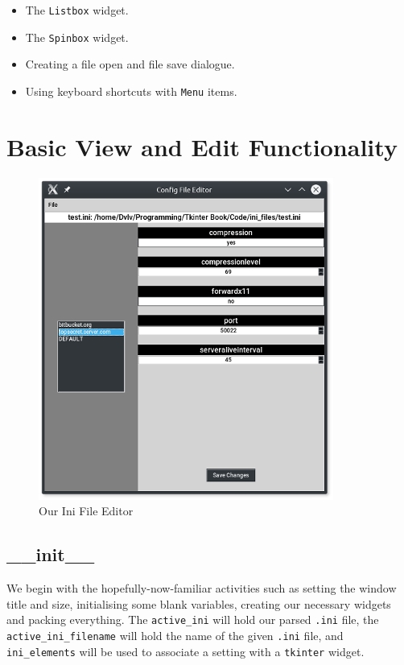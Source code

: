 \documentclass[a4paper,11pt,openany]{book}
\begin{document}
\begin{itemize}
  \item The \lstinline[columns=fixed]{Listbox} widget.
  \item The \lstinline[columns=fixed]{Spinbox} widget.
  \item Creating a file open and file save dialogue.
  \item Using keyboard shortcuts with \lstinline[columns=fixed]{Menu} items.
\end{itemize} 

\section{Basic View and Edit Functionality}

\begin{figure}[h]
\centering
\includegraphics{Ch5-1}
\caption{Our Ini File Editor}
\end{figure}

\newpage

 

\subsection{\_\_init\_\_}

We begin with the hopefully-now-familiar activities such as setting the window title and size, initialising some blank variables, creating our necessary widgets and packing everything. The \lstinline[columns=fixed]{active_ini} will hold our parsed \lstinline[columns=fixed]{.ini} file, the \lstinline[columns=fixed]{active_ini_filename} will hold the name of the given \lstinline[columns=fixed]{.ini} file, and \lstinline[columns=fixed]{ini_elements} will be used to associate a setting with a \lstinline[columns=fixed]{tkinter} widget. 
\end{document}
